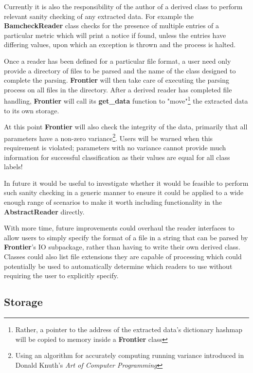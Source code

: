 Currently it is also the responsibility of the author of a derived class to
perform relevant sanity checking of any extracted data. For example the
\textbf{BamcheckReader} class checks for the presence of multiple entries of a
particular metric which will print a notice if found, unless the entries have
differing values, upon which an exception is thrown and the process is halted.

Once a reader has been defined for a particular file format, a user need only
provide a directory of files to be parsed and the name of the class designed to
complete the parsing. \textbf{Frontier} will then take care of executing the parsing
process on all files in the directory. After a derived reader has completed file
handling, \textbf{Frontier} will call its \textbf{get\_data} function to
"move"\footnote{Rather, a pointer to the address of the extracted data's
dictionary hashmap will be copied to memory inside a \textbf{Frontier} class} the
extracted data to its own storage.

At this point \textbf{Frontier} will also check the integrity of the data, primarily
that all parameters have a non-zero variance\footnote{Using an algorithm for
accurately computing running variance introduced in Donald Knuth's \textit{Art
of Computer Programming}\citep{knuth1998art-variance}}. Users will be warned
when this requirement is violated; parameters with no variance cannot provide
much information for successful classification as their values are equal for
all class labels!

In future it would be useful to investigate whether it would be feasible to
perform such sanity checking in a generic manner to ensure it could be applied
to a wide enough range of scenarios to make it worth including functionality in
the \textbf{AbstractReader} directly.

With more time, future improvements could overhaul the reader interfaces
to allow users to simply specify the format of a file in a string that can be
parsed by \textbf{Frontier}'s IO subpackage, rather than having to write their own derived
class. Classes could also list file extensions they are capable of processing
which could potentially be used to automatically determine which readers to use
without requiring the user to explicitly specify.


\subsection{Storage}

